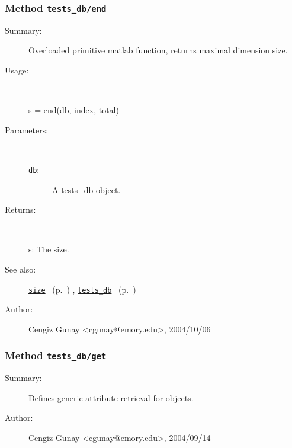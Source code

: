 \subsubsection[Method \texttt{end}]{Method \texttt{tests\_db/end}}%
%
\label{ref_tests_db__end}%
\hypertarget{ref_tests_db__end}{}%
\begin{description}
\item[Summary:]Overloaded primitive matlab function, returns maximal dimension size.
%
\item[Usage:]~%
\begin{lyxcode}%
s = end(db, index, total)
%
\end{lyxcode}%
%
%
\item[Parameters:]~
\begin{description}%
\item[\texttt{db}:]
 A tests\_db object.
\end{description}%
%
\item[Returns:]~

	s: The size.
%
%
\item[See also:]%
\hyperlink{ref_size}{\texttt{size}}%
\ (p.~\pageref{ref_size})%
%
, \hyperlink{ref_tests_db}{\texttt{tests\_db}}%
\ (p.~\pageref{ref_tests_db})%
%
%
\item[Author:]%
Cengiz Gunay <cgunay@emory.edu>, 2004/10/06%
\end{description}
\methodline%
\subsubsection[Method \texttt{get}]{Method \texttt{tests\_db/get}}%
%
\label{ref_tests_db__get}%
\hypertarget{ref_tests_db__get}{}%
\begin{description}
\item[Summary:]Defines generic attribute retrieval for objects.
%
%
%
%
%
%
%
\item[Author:]%
Cengiz Gunay <cgunay@emory.edu>, 2004/09/14%
\end{description}
\methodline%
